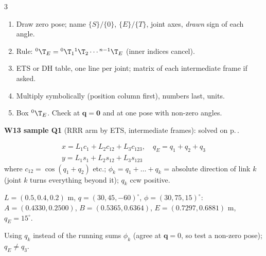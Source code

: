 \newcommand{\wtwoDH}[1]{\renewcommand{\arraystretch}{1.05}\begin{tabular}{@{}c|cccc@{}}$i$&$a_{i-1}$&$\alpha_{i-1}$&$d_i$&$\theta_i$\\\hline #1\end{tabular}}

\begin{multicols}{3}

\begin{recipe}
\begin{enumerate}
\item Draw zero pose; name $\{S\}/\{0\}$, $\{E\}/\{T\}$, joint axes, \emph{drawn} sign of each angle.
\item Rule: ${}^0\T_E={}^0\T_1{}^1\T_2\cdots{}^{n-1}\T_E$ (inner indices cancel).
\item ETS or DH table, one line per joint; matrix of each intermediate frame if asked.
\item Multiply symbolically (position column first), numbers last, units.
\item Box ${}^0\T_E$. Check at $\mathbf q=\mathbf 0$ and at one pose with non-zero angles.
\end{enumerate}
\end{recipe}
\textbf{W13 sample Q1} (RRR arm by ETS, intermediate frames): solved on p.\,\pageref{p:SAMPLE}.

\begin{fbx}
\begin{gather*}x=L_1c_1+L_2c_{12}+L_3c_{123},\quad q_E=q_1+q_2+q_3\\y=L_1s_1+L_2s_{12}+L_3s_{123}\end{gather*}
where $c_{12}=\cos(q_1{+}q_2)$ etc.; $\phi_k=q_1+\dots+q_k$ = absolute direction of link $k$ (joint $k$ turns everything beyond it); $q_k$ ccw positive.
\end{fbx}
\begin{worked}[numbers]
$L=(0.5,0.4,0.2)$ m, $q=(30,45,-60)^\circ$, $\phi=(30,75,15)^\circ$: $A=(0.4330,0.2500)$, $B=(0.5365,0.6364)$, $E=(0.7297,0.6881)$ m, $q_E=15^\circ$. \chk
\end{worked}
\begin{trap}
Using $q_k$ instead of the running sums $\phi_k$ (agree at $\mathbf q=0$, so test a non-zero pose); $q_E\neq q_3$.
\end{trap}


\end{multicols}
